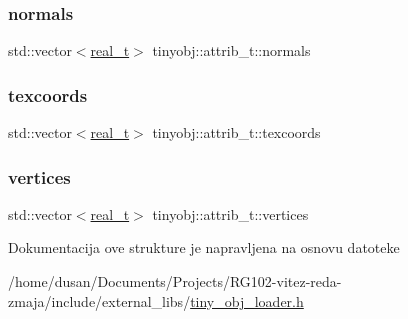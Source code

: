 \mbox{\label{structtinyobj_1_1attrib__t_ac647590e9a03bec3c6cee5c215781e12}} 
\subsubsection{\texorpdfstring{normals}{normals}}
{\footnotesize\ttfamily std\+::vector$<$\hyperlink{namespacetinyobj_ad5ca7469ff56bf0d8423120cfd99adce}{real\+\_\+t}$>$ tinyobj\+::attrib\+\_\+t\+::normals}

\mbox{\label{structtinyobj_1_1attrib__t_aad958a1ea44377cfd3dd007d3b15d887}} 
\subsubsection{\texorpdfstring{texcoords}{texcoords}}
{\footnotesize\ttfamily std\+::vector$<$\hyperlink{namespacetinyobj_ad5ca7469ff56bf0d8423120cfd99adce}{real\+\_\+t}$>$ tinyobj\+::attrib\+\_\+t\+::texcoords}

\mbox{\label{structtinyobj_1_1attrib__t_a1c79c00f3baa0888a5efcfc68a4d419e}} 
\subsubsection{\texorpdfstring{vertices}{vertices}}
{\footnotesize\ttfamily std\+::vector$<$\hyperlink{namespacetinyobj_ad5ca7469ff56bf0d8423120cfd99adce}{real\+\_\+t}$>$ tinyobj\+::attrib\+\_\+t\+::vertices}



Dokumentacija ove strukture je napravljena na osnovu datoteke \begin{DoxyCompactItemize}
\item 
/home/dusan/\+Documents/\+Projects/\+R\+G102-\/vitez-\/reda-\/zmaja/include/external\+\_\+libs/\hyperlink{tiny__obj__loader_8h}{tiny\+\_\+obj\+\_\+loader.\+h}\end{DoxyCompactItemize}
